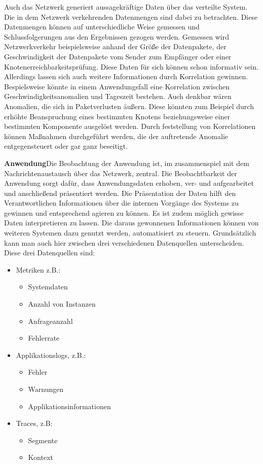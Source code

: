 	Auch das Netzwerk generiert aussagekräftige Daten über das verteilte System. Die in dem Netzwerk verkehrenden Datenmengen sind dabei zu betrachten. Diese Datenmengen können auf unterschiedliche Weise gemessen und Schlussfolgerungen aus den Ergebnissen gezogen werden. Gemessen wird Netzwerkverkehr beispielsweise anhand der Größe der Datenpakete, der Geschwindigkeit der Datenpakete vom Sender zum Empfänger oder einer Knotenerreichbarkeitsprüfung. Diese Daten für sich können schon informativ sein. Allerdings lassen sich auch weitere Informationen durch Korrelation gewinnen. Bespielsweise könnte in einem Anwendungsfall eine Korrelation zwischen Geschwindigkeitsanomalien und Tageszeit bestehen. Auch denkbar wären Anomalien, die sich in Paketverlusten äußern. Diese könnten zum Beispiel durch erhöhte Beanspruchung eines bestimmten Knotens beziehungsweise einer bestimmten Komponente ausgelöst werden. Durch feststellung von Korrelationen können Maßnahmen durchgeführt werden, die der auftretende Anomalie entgegensteuert oder gar ganz beseitigt.
	
	\textbf{Anwendung}\space\space\space Die Beobachtung der Anwendung ist, im zusammenspiel mit dem Nachrichtenaustausch über das Netzwerk, zentral. Die Beobachtbarkeit der Anwendung sorgt dafür, dass Anwendungsdaten erhoben, ver- und aufgearbeitet und anschließend präsentiert werden. Die Präsentation der Daten hilft den Verantwortlichen Informationen über die internen Vorgänge des Systems zu gewinnen und entsprechend agieren zu können. Es ist zudem möglich gewisse Daten interpretieren zu lassen. Die daraus gewonnenen Informationen können von weiteren Systemen dazu genutzt werden, automatisiert zu steuern. Grundsätzlich kann man auch hier zwischen drei verschiedenen Datenquellen unterscheiden. Diese drei Datenquellen sind:
	
	\begin{itemize}
		\item Metriken z.B.:
		\begin{itemize}
			\item Systemdaten
			\item Anzahl von Instanzen
			\item Anfrageanzahl
			\item Fehlerrate
		\end{itemize}
		\item Applikationslogs, z.B.:
		\begin{itemize}
			\item Fehler
			\item Warnungen
			\item Applikationsinformationen
		\end{itemize}
		\item Traces, z.B:
		\begin{itemize}
			\item Segmente
			\item Kontext
		\end{itemize}
	\end{itemize}


